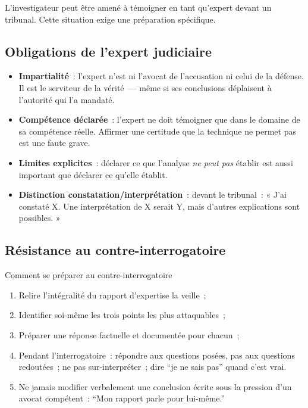 L'investigateur peut être amené à témoigner en tant qu'expert devant
un tribunal. Cette situation exige une préparation spécifique.

\subsection{Obligations de l'expert judiciaire}

\begin{itemize}
    \item \textbf{Impartialité}~: l'expert n'est ni l'avocat de
          l'accusation ni celui de la défense. Il est le serviteur
          de la vérité~--- même si ses conclusions déplaisent à
          l'autorité qui l'a mandaté.
    \item \textbf{Compétence déclarée}~: l'expert ne doit témoigner
          que dans le domaine de sa compétence réelle. Affirmer une
          certitude que la technique ne permet pas est une faute grave.
    \item \textbf{Limites explicites}~: déclarer ce que l'analyse
          \emph{ne peut pas} établir est aussi important que déclarer
          ce qu'elle établit.
    \item \textbf{Distinction constatation/interprétation}~: devant
          le tribunal~: « J'ai constaté X. Une interprétation de X
          serait Y, mais d'autres explications sont possibles. »
\end{itemize}

\subsection{Résistance au contre-interrogatoire}

\begin{boiteRemarque}{Comment se préparer au contre-interrogatoire}
\begin{enumerate}
    \item Relire l'intégralité du rapport d'expertise la veille~;
    \item Identifier soi-même les trois points les plus attaquables~;
    \item Préparer une réponse factuelle et documentée pour chacun~;
    \item Pendant l'interrogatoire~: répondre aux questions posées,
          pas aux questions redoutées~; ne pas sur-interpréter~;
          dire ``je ne sais pas'' quand c'est vrai.
    \item Ne jamais modifier verbalement une conclusion écrite
          sous la pression d'un avocat compétent~: ``Mon rapport
          parle pour lui-même.''
\end{enumerate}
\end{boiteRemarque}

